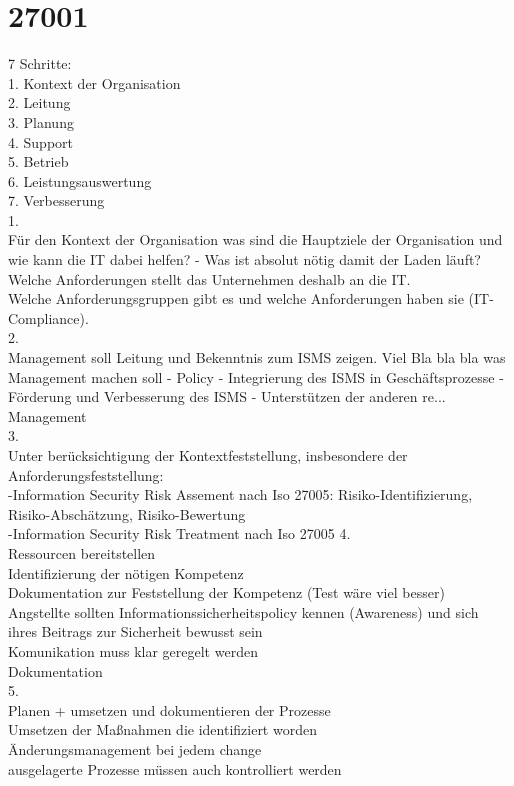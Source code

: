 \documentclass[a4paper,10pt]{scrartcl}
\begin{document}
\section{27001}
7 Schritte:\\
1. Kontext der Organisation\\
2. Leitung\\
3. Planung\\
4. Support\\
5. Betrieb\\
6. Leistungsauswertung\\
7. Verbesserung\\
1.\\
Für den Kontext der Organisation was sind die Hauptziele der Organisation und wie kann
die IT dabei helfen? - Was ist absolut nötig damit der Laden läuft?\\
Welche Anforderungen stellt das Unternehmen deshalb an die IT.\\
Welche Anforderungsgruppen gibt es und welche Anforderungen haben sie (IT-Compliance).\\
2.\\
Management soll Leitung und Bekenntnis zum ISMS zeigen. Viel Bla bla bla
was Management machen soll - Policy - Integrierung des ISMS in Geschäftsprozesse - Förderung und Verbesserung des ISMS - Unterstützen der anderen re... Management\\
3.\\
Unter berücksichtigung der Kontextfeststellung, insbesondere der Anforderungsfeststellung:\\
-Information Security Risk Assement nach Iso 27005: Risiko-Identifizierung, Risiko-Abschätzung, Risiko-Bewertung\\
-Information Security Risk Treatment nach Iso 27005
4.\\
Ressourcen bereitstellen\\
Identifizierung der nötigen Kompetenz\\
Dokumentation zur Feststellung der Kompetenz (Test wäre viel besser)\\
Angstellte sollten Informationssicherheitspolicy kennen (Awareness) und sich ihres
Beitrags zur Sicherheit bewusst sein\\
Komunikation muss klar geregelt werden\\
Dokumentation\\
5.\\
Planen + umsetzen und dokumentieren der Prozesse\\
Umsetzen der Maßnahmen die identifiziert worden\\
Änderungsmanagement bei jedem change\\
ausgelagerte Prozesse müssen auch kontrolliert werden\\
\end{document}
